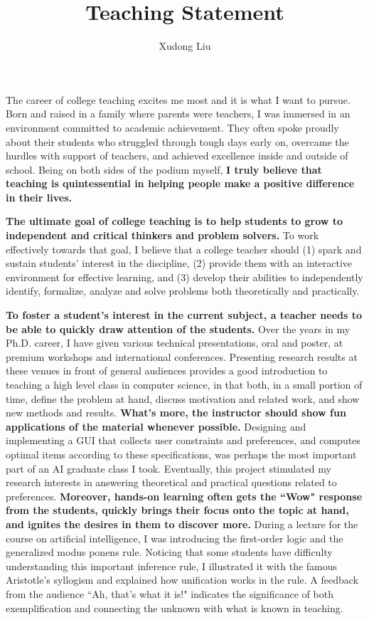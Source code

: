 \documentclass[12pt]{article}
\title{Teaching Statement\vspace{-0.4cm}}
\author{Xudong Liu}
\date{}
\newcommand{\tbf}[1]{\textbf{#1}}
\begin{document}
\maketitle%

The career of college teaching excites me most and it is what I want to pursue.
Born and raised in a family where parents were teachers, I was immersed in an environment 
committed to academic achievement. They often spoke proudly about their students who
struggled through tough days early on, overcame the hurdles with support of teachers, and 
achieved excellence inside and outside of school. 
Being on both sides of the podium myself, \tbf{I truly believe that
teaching is quintessential in helping people make a positive difference in their lives.}

\tbf{The ultimate goal of college teaching is to help students to grow to independent 
and critical thinkers and problem solvers.}
To work effectively towards that goal, I believe that a college teacher should
(1) spark and sustain students' interest in the discipline,
(2) provide them with an interactive environment for effective learning, and
(3) develop their abilities to independently identify, formalize, analyze 
and solve problems both theoretically and practically.

\tbf{To foster a student's interest in the current subject, 
a teacher needs to be able to quickly draw attention of the students.}
Over the years in my Ph.D. career, I have given various technical
presentations, oral and poster, at premium workshops and international conferences.
Presenting research results at these venues in front of general audiences
provides a good introduction to teaching a high level class in computer science,
in that both, in a small portion of time, define the problem at hand, discuss motivation and related work,
and show new methods and results.
\tbf{What's more, the instructor should show fun
applications of the material whenever possible.}
Designing and implementing a GUI that collects user constraints and preferences,
and computes optimal items according to these specifications, was perhaps the most important part
of an AI graduate class I took.
Eventually, this project stimulated my research interests in answering theoretical and
practical questions related to preferences.
\tbf{Moreover, hands-on learning often gets the ``Wow" response from the students, 
quickly brings their focus onto the topic at hand,
and ignites the desires in them to discover more.}
During a lecture for the course on artificial intelligence,
I was introducing the first-order logic and the generalized modus ponens
rule.  Noticing that some students have difficulty understanding this
important inference rule, I illustrated it with the famous 
Aristotle's syllogism and explained how unification works in the rule.
A feedback from the audience ``Ah, that's what it is!" indicates
the significance of both exemplification and connecting the unknown with
what is known in teaching.
\end{document}

